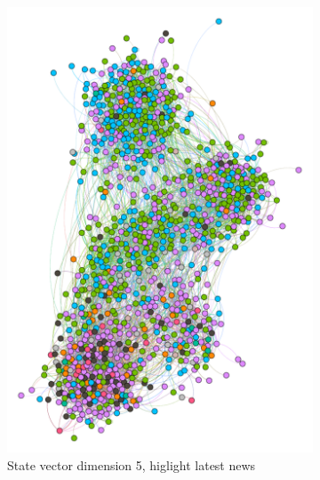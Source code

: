 \begin{figure}
\begin{subfigure}[t]{0.25\textwidth}
    \label{fig:bubble3news}
  \end{subfigure}
  ~
  \begin{subfigure}[t]{0.35\textwidth}
    \includegraphics[width=\textwidth]{img/dim5_news.pdf}
    \caption{State vector dimension 5, higlight
     latest news}
    \label{fig:bubble5news}
  \end{subfigure}
  ~
  \begin{subfigure}[t]{0.35\textwidth}

\end{subfigure}
\end{figure}
